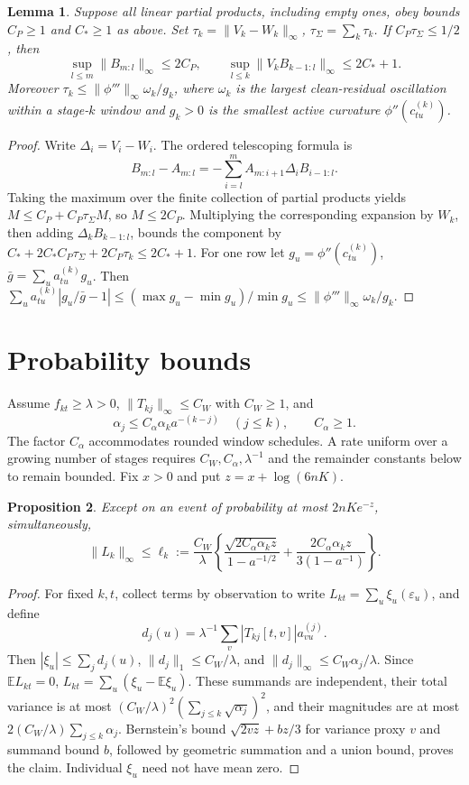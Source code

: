 \documentclass[11pt]{article}
\newcommand{\E}{\mathbb E}
\newcommand{\norm}[1]{\lVert #1\rVert}
\newtheorem{proposition}{Proposition}
\newtheorem{lemma}[proposition]{Lemma}
\theoremstyle{remark}
\begin{document}
\begin{lemma}\label{lem:perturb}
Suppose all linear partial products, including empty ones, obey bounds
\(C_P\ge1\) and \(C_*\ge1\) as above. Set
\(\tau_k=\norm{V_k-W_k}_\infty\), \(\tau_\Sigma=\sum_k\tau_k\).
If \(C_P\tau_\Sigma\le1/2\), then
\[
 \sup_{l\le m}\norm{B_{m:l}}_\infty\le2C_P,\qquad
 \sup_{l\le k}\norm{V_kB_{k-1:l}}_\infty\le2C_*+1.
\]
Moreover \(\tau_k\le\norm{\phi'''}_\infty\omega_k/g_k\), where \(\omega_k\)
is the largest clean-residual oscillation within a stage-\(k\) window and
\(g_k>0\) is the smallest active curvature \(\phi''(c^{(k)}_{tu})\).
\end{lemma}
\begin{proof}
Write \(\Delta_i=V_i-W_i\). The ordered telescoping formula is
\[
 B_{m:l}-A_{m:l}=-\sum_{i=l}^m A_{m:i+1}\Delta_iB_{i-1:l}.
\]
Taking the maximum over the finite collection of partial products yields
\(M\le C_P+C_P\tau_\Sigma M\), so \(M\le2C_P\).
Multiplying the corresponding expansion by \(W_k\), then adding
\(\Delta_kB_{k-1:l}\), bounds the component by
\(C_*+2C_*C_P\tau_\Sigma+2C_P\tau_k\le2C_*+1\).
For one row let \(g_u=\phi''(c^{(k)}_{tu})\), \(\bar g=\sum_u a^{(k)}_{tu}g_u\).
Then \(\sum_u a^{(k)}_{tu}|g_u/\bar g-1|
\le(\max g_u-\min g_u)/\min g_u\le\norm{\phi'''}_\infty\omega_k/g_k\).
\end{proof}

\section{Probability bounds}
Assume \(f_{kt}\ge\lambda>0\),
\(\norm{T_{kj}}_\infty\le C_W\) with \(C_W\ge1\), and
\[
 \alpha_j\le C_\alpha\alpha_k a^{-(k-j)}\quad(j\le k),\qquad C_\alpha\ge1.
\]
The factor \(C_\alpha\) accommodates rounded window schedules. A rate uniform
over a growing number of stages requires \(C_W,C_\alpha,\lambda^{-1}\)
and the remainder constants below to remain bounded. Fix \(x>0\)
and put \(z=x+\log(6nK)\).

\begin{proposition}\label{prop:concentration}
Except on an event of probability at most \(2nKe^{-z}\), simultaneously,
\[
 \norm{L_k}_\infty\le\ell_k:=
 \frac{C_W}{\lambda}\left\{
 \frac{\sqrt{2C_\alpha\alpha_k z}}{1-a^{-1/2}}
 +\frac{2C_\alpha\alpha_k z}{3(1-a^{-1})}\right\}.
\]
\end{proposition}
\begin{proof}
For fixed \(k,t\), collect terms by observation to write
\(L_{kt}=\sum_u\xi_u(\varepsilon_u)\), and define
\[
 d_j(u)=\lambda^{-1}\sum_v|T_{kj}[t,v]|a^{(j)}_{vu}.
\]
Then \(|\xi_u|\le\sum_jd_j(u)\), \(\norm{d_j}_1\le C_W/\lambda\), and
\(\norm{d_j}_\infty\le C_W\alpha_j/\lambda\). Since \(\E L_{kt}=0\),
\(L_{kt}=\sum_u(\xi_u-\E\xi_u)\). These summands are independent,
their total variance is at most
\((C_W/\lambda)^2(\sum_{j\le k}\sqrt{\alpha_j})^2\), and their magnitudes
are at most \(2(C_W/\lambda)\sum_{j\le k}\alpha_j\).
Bernstein's bound \(\sqrt{2vz}+bz/3\) for variance proxy \(v\) and
summand bound \(b\), followed by geometric summation and a union bound,
proves the claim. Individual \(\xi_u\) need not have mean zero.
\end{proof}
\end{document}
